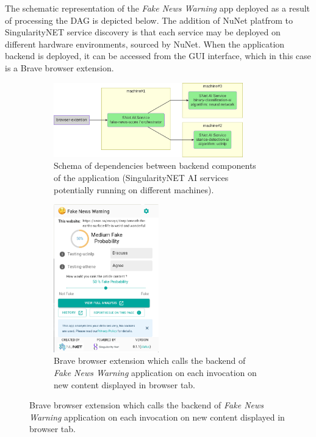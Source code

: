 \documentclass[]{report}
\begin{document}
The schematic representation of the \textit{Fake News Warning} app deployed as a
result of processing the DAG is depicted below. The addition of NuNet platfrom
to SingularityNET service discovery is that each service may be deployed on
different hardware environments, sourced by NuNet. When the application backend
is deployed, it can be accessed from the GUI interface, which in this case is a
Brave browser extension.

\begin{figure}[H]
  \begin{subfigure}[b]{0.50\textwidth}
    \centering
    \includegraphics[width=0.9\textwidth]{../../../ontology/images/fake_news_detector.png}
    \captionsetup{width=0.8\linewidth}
    \caption{Schema of dependencies between backend components of the application
    (SingularityNET AI services potentially running on different machines).}
    \label{fig:fake_news_detector_schema}
  \end{subfigure}
  \begin{subfigure}[b]{0.50\textwidth}
    \centering
    \includegraphics[width=0.5\textwidth]{../../../ontology/images/fake_news_detector_browser_extension.png}
    \captionsetup{width=0.8\linewidth}
    \caption{Brave browser extension which calls the backend of
    \textit{Fake News Warning} application on each invocation on new
    content displayed in browser tab.}
  \end{subfigure}
\end{figure}
\end{document}
